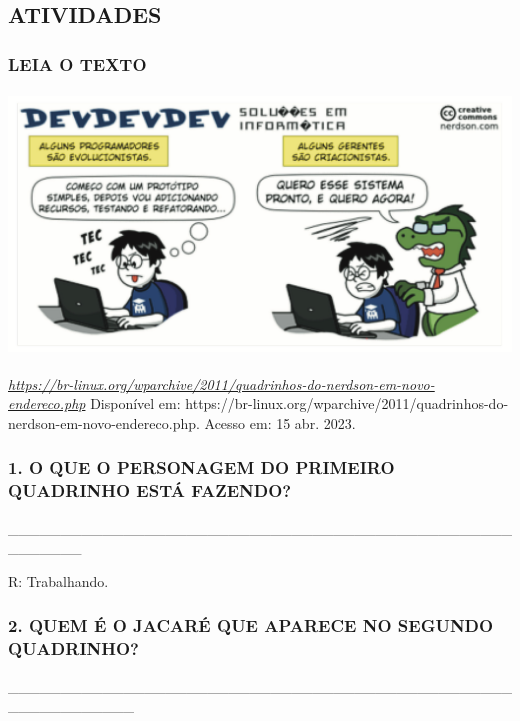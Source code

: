 \subsection{ATIVIDADES}\label{atividades-6}

\subsubsection{LEIA O TEXTO}\label{leia-o-texto-2}

\includegraphics[width=5.50365in,height=2.75183in]{media/image171.png}

\href{https://br-linux.org/wparchive/2011/quadrinhos-do-nerdson-em-novo-endereco.php}{\emph{https://br-linux.org/wparchive/2011/quadrinhos-do-nerdson-em-novo-endereco.php}}
Disponível em: https://br-linux.org/wparchive/2011/quadrinhos-do-nerdson-em-novo-endereco.php. Acesso em: 15 abr. 2023.

\subsubsection{1. O QUE O PERSONAGEM DO PRIMEIRO QUADRINHO ESTÁ
FAZENDO?}\label{o-que-o-personagem-do-primeiro-quadrinho-estuxe1-fazendo}

\_\_\_\_\_\_\_\_\_\_\_\_\_\_\_\_\_\_\_\_\_\_\_\_\_\_\_\_\_\_\_\_\_\_\_\_\_\_\_\_\_\_\_\_\_\_\_\_\_\_\_\_\_\_\_

R: Trabalhando.

\subsubsection{2. QUEM É O JACARÉ QUE APARECE NO SEGUNDO
QUADRINHO?}\label{para-vocuxea-quem-uxe9-que-o-jacaruxe9-que-aparece-no-segundo-quadrinho}

\_\_\_\_\_\_\_\_\_\_\_\_\_\_\_\_\_\_\_\_\_\_\_\_\_\_\_\_\_\_\_\_\_\_\_\_\_\_\_\_\_\_\_\_\_\_\_\_\_\_\_\_\_\_\_\_\_\_\_\_

